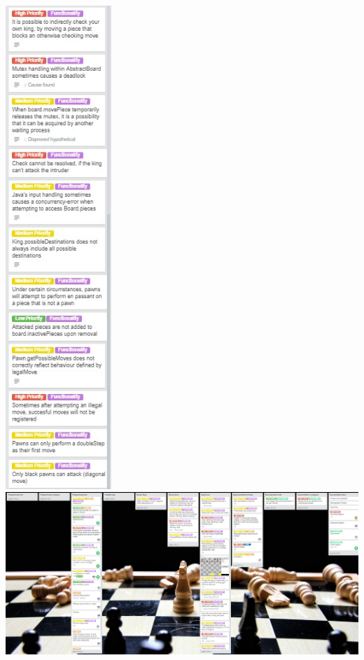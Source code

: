 \documentclass{article}
\begin{document}
\includegraphics[width=4cm]{20180508-bugsfixed2.jpg} \\
\includegraphics[width=16cm]{20180510-hele.jpg} \\
\end{document}
